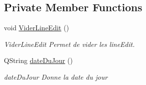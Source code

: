 \subsection*{Private Member Functions}
\begin{DoxyCompactItemize}
\item 
\mbox{\label{class_main_window_a53545f2984068242c673e3c4adb57ac0}} 
void \mbox{\hyperlink{class_main_window_a53545f2984068242c673e3c4adb57ac0}{Vider\+Line\+Edit}} ()
\begin{DoxyCompactList}\small\item\em Vider\+Line\+Edit Permet de vider les line\+Edit. \end{DoxyCompactList}\item 
Q\+String \mbox{\hyperlink{class_main_window_a2910003709af8f8f8f9263bcbb13ed09}{date\+Du\+Jour}} ()
\begin{DoxyCompactList}\small\item\em date\+Du\+Jour Donne la date du jour \end{DoxyCompactList}\end{DoxyCompactItemize}
